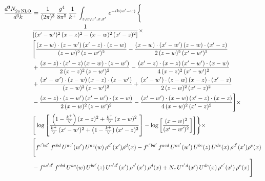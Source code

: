 \documentclass[10pt]{article}
\numberwithin{equation}{section}
\begin{document}
\begin{align}
    \frac{d^{3}N_{2a\,\rm NLO}^{\rm}}{d^{3}k}  & =  \frac{1}{(2\pi)^{3}}\, \frac{g^{4}}{8\pi^{5}}\,\frac{1}{k^{+}}\,\int_{z,w,w^{\prime},x,x'}\, e^{-ik(w^{\prime}-w)}\, \Bigg\{\notag \\
& \frac{1}{\left[(x'-w')^{2}\, (x-z)^{2}-(x-w)^{2}\, (x'-z)^{2}\right]}\times\,\notag \\ & \Bigg[\frac{(x-w)\cdot (z-w')\, (x'-z)\cdot (z-w)}{(z-w)^{2}\,(z-w')^{2}}-\frac{(x-w)\cdot (x'-w')\, (z-w)\cdot (x'-z)}{2\, (z-w)^{2}\, (x'-w')^{2}}\notag \\ & + \frac{(x-z)\cdot (x'-z)\, (x-w)\cdot (z-w')}{2\, (x-z)^{2}\, (z-w')^{2}}-\frac{(x'-z)\cdot (x-z)\, (x'-w')\cdot (x-w)}{4\, (x-z)^{2}\, (x'-w')^{2}}\notag \\ & + \frac{(x'-w')\cdot (z-w)\, (x-z)\cdot (z-w')}{(z-w)^{2}\,(z-w')^{2}}+\frac{(x'-w')\cdot (z-w)\, (x-z)\cdot (x'-z)}{2\, (z-w)^{2}\, (x'-z)^{2}}\notag \\ & - \frac{(x-z)\cdot (z-w')\, (x'-w')\cdot (x-w)}{2\, (x-w)^{2}\, (z-w')^{2}} -\frac{(x'-w')\cdot (x-w)\, (x'-z)\cdot (x-z)}{4\, (x-w)^{2}\, (x'-z)^{2}}\Bigg]\times\notag \\ &  \Bigg[\log{\left[\frac{\left(1-\frac{k^{+}}{\vee}\right)(x-z)^{2}+\frac{k^{+}}{\vee}\,(x-w)^{2}}{\frac{k^{+}}{\vee}\, (x'-w')^{2} + \left(1-\frac{k^{+}}{\vee}\right) (x'-z)^{2}}\right]}-\log{\left[\frac{(x-w)^{2}}{(x'-w')^{2}}\right]}\Bigg]\Bigg\} \times\, \notag \\ & \Bigg[f^{c'bd'}\,f^{cbd}\, U^{ac'}(w')\,U^{ac}(w)\,\rho^{d'}(x')\rho^{d}(x)- f^{c'bd'}\,f^{acd}\,U^{ac'}(w')\,U^{bc}(z)\,U^{de}(x)\,\rho^{d'}(x')\rho^{e}(x) \notag \\ & -f^{ac'd'}\,f^{cbd}\,U^{ac}(w)\,U^{bc'}(z)\,U^{e'd'}(x')\,\rho^{e'}(x')\,\rho^{d}(x) +N_{c}\,U^{e'd}(x')\,U^{de}(x)\,\rho^{e'}(x')\,\rho^{e}(x)\Bigg]
\end{align}
\end{document}

